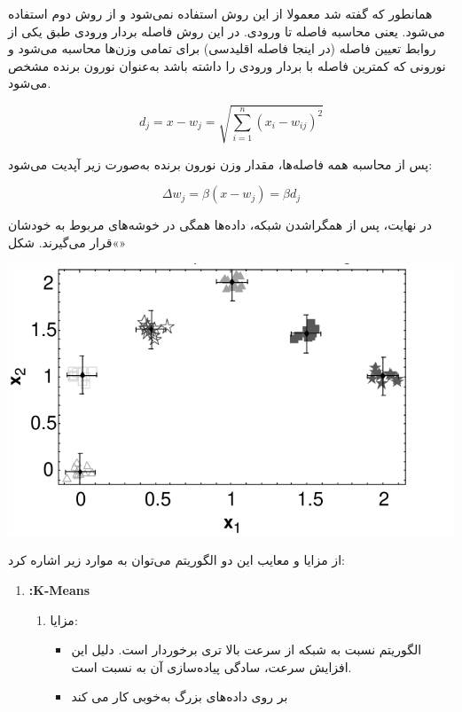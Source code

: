 \begin{enumerate}
\begin{qsolve}
 
 همانطور که گفته شد معمولا از این روش استفاده نمی‌شود و از روش دوم استفاده می‌شود. یعنی محاسبه فاصله تا ورودی. در این روش فاصله بردار ورودی طبق یکی از روابط تعیین فاصله (در اینجا فاصله اقلیدسی) برای تمامی وزن‌ها محاسبه می‌شود و نورونی که کمترین فاصله با بردار ورودی را داشته باشد به‌عنوان نورون برنده مشخص می‌شود.
 
 $$ d_j=x-w_j=\sqrt{\sum_{i=1}^{n} (x_i-w_{ij})^2} $$
 
 پس از محاسبه همه فاصله‌ها، مقدار وزن نورون برنده به‌صورت زیر آپدیت می‌شود:
 
 $$ \Delta w_j=\beta(x-w_j)=\beta d_j$$
 
 در نهایت، پس از همگراشدن شبکه، داده‌ها همگی در خوشه‌های مربوط به خودشان قرار می‌گیرند. شکل«»
 
 \begin{center}
 	\includegraphics*[width=0.8\linewidth]{pics/img8.png}
 	\label{داده‌های خوشه‌بندی شده شبکه SOM پس از آموزش}
 \end{center}
 
 
 از مزایا و معایب این دو الگوریتم می‌توان به موارد زیر اشاره کرد:

\end{qsolve}




\begin{qsolve}
	\begin{enumerate}
		\item \textbf{:K-Means}
		\begin{enumerate}
			\item مزایا: 
			\begin{itemize}
				\item الگوریتم  نسبت به شبکه  از سرعت بالا تری برخوردار است. دلیل این افزایش سرعت، سادگی پیاده‌سازی آن به نسبت  است.
				
				\item بر روی داده‌های بزرگ به‌خوبی کار می کند
			\end{itemize}
			

\end{enumerate}
\end{enumerate}
\end{qsolve}
\end{enumerate}
